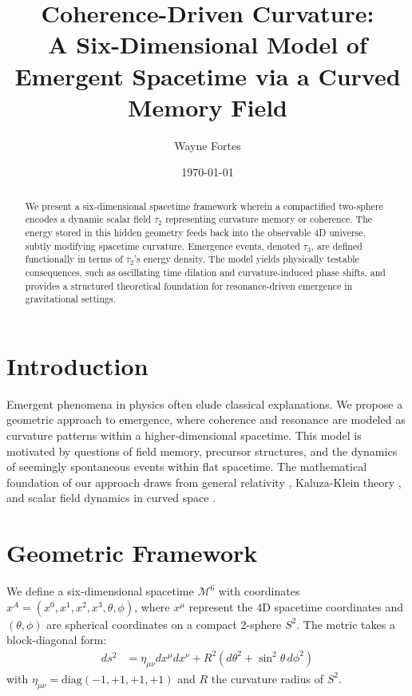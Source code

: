 \documentclass[12pt]{article}
\title{Coherence-Driven Curvature:\\A Six-Dimensional Model of Emergent Spacetime via a Curved Memory Field}
\author{Wayne Fortes}
\date{\today}
\begin{document}
\maketitle

\begin{abstract}
We present a six-dimensional spacetime framework wherein a compactified two-sphere encodes a dynamic scalar field $\tau_2$ representing curvature memory or coherence. The energy stored in this hidden geometry feeds back into the observable 4D universe, subtly modifying spacetime curvature. Emergence events, denoted $\tau_3$, are defined functionally in terms of $\tau_2$'s energy density. The model yields physically testable consequences, such as oscillating time dilation and curvature-induced phase shifts, and provides a structured theoretical foundation for resonance-driven emergence in gravitational settings.
\end{abstract}

\section{Introduction}

Emergent phenomena in physics often elude classical explanations. We propose a geometric approach to emergence, where coherence and resonance are modeled as curvature patterns within a higher-dimensional spacetime. This model is motivated by questions of field memory, precursor structures, and the dynamics of seemingly spontaneous events within flat spacetime. The mathematical foundation of our approach draws from general relativity \cite{misner1973gravitation}, Kaluza-Klein theory \cite{appelquist1987kaluza}, and scalar field dynamics in curved space \cite{birrell1982quantum}.

\section{Geometric Framework}

We define a six-dimensional spacetime $\mathcal{M}^6$ with coordinates $x^A = (x^0, x^1, x^2, x^3, \theta, \phi)$, where $x^\mu$ represent the 4D spacetime coordinates and $(\theta, \phi)$ are spherical coordinates on a compact 2-sphere $S^2$. The metric takes a block-diagonal form:
\begin{align}
  ds^2 &= \eta_{\mu\nu} dx^\mu dx^\nu + R^2 (d\theta^2 + \sin^2\theta\, d\phi^2)
\end{align}
with $\eta_{\mu\nu} = \text{diag}(-1, +1, +1, +1)$ and $R$ the curvature radius of $S^2$.
\end{document}

